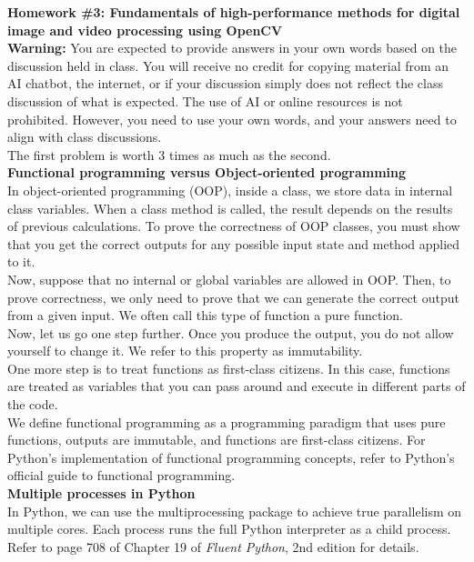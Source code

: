 \documentclass[11pt]{article}
\begin{document}
	\textbf{Homework \#3: Fundamentals of high-performance methods for digital image and video processing using OpenCV}\\
	
	\textbf{Warning:} You are expected to provide answers in your own words based on the discussion held in class. You will receive no credit for copying material from an AI chatbot, the internet, or if your discussion simply does not reflect the class discussion of what is expected. The use of AI or online resources is not prohibited. However, you need to use your own words, and your answers need to align with class discussions.\\
	
	The first problem is worth 3 times as much as the second.\\
	
	\textbf{Functional programming versus Object-oriented programming}\\
	
	In object-oriented programming (OOP), inside a class, we store data in internal class variables. When a class method is called, the result depends on the results of previous calculations. To prove the correctness of OOP classes, you must show that you get the correct outputs for any possible input state and method applied to it.\\
	
	Now, suppose that no internal or global variables are allowed in OOP. Then, to prove correctness, we only need to prove that we can generate the correct output from a given input. We often call this type of function a pure function.\\
	
	Now, let us go one step further. Once you produce the output, you do not allow yourself to change it. We refer
	to this property as immutability.\\
	
	One more step is to treat functions as first-class citizens. In this case, functions are treated as variables that you can pass around and execute in different parts of the code.\\
	
	We define functional programming as a programming paradigm that uses pure functions, outputs are immutable, and functions are first-class citizens. For Python's implementation of functional programming concepts, refer to
	Python's official guide to functional programming.\\
	
	\textbf{Multiple processes in Python}\\
	In Python, we can use the multiprocessing package to achieve true parallelism on multiple cores. Each process runs the full Python interpreter as a child process. Refer to page 708 of Chapter 19
	of \emph{Fluent Python}, 2nd edition for details.\\
	
\end{document}
